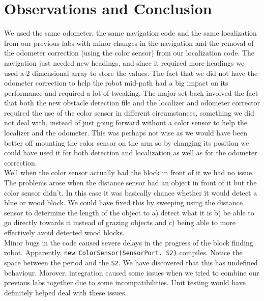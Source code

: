 \documentclass[letterpaper,12pt]{article}
\begin{document}
\section{Observations and Conclusion}{
We used the same odometer, the same navigation code and the same localization from our previous labs with minor changes in the navigation and the removal of the odometer correction (using the color sensor) from our localization code. The navigation just needed new headings, and since it required more headings we used a 2 dimensional array to store the values. The fact that we did not have the odometer correction to help the robot mid-path had a big impact on its performance and required a lot of tweaking. The major set-back involved the fact that both the new obstacle detection file and the localizer and odometer corrector required the use of the color sensor in different circumstances, something we did not deal with, instead of just going forward without a color sensor to help the localizer and the odometer. This was perhaps not wise as we would have been better off mounting the color sensor on the arm so by changing its position we could have used it for both detection and localization as well as for the odometer correction.\\
Well when the color sensor actually had the block in front of it we had no issue. The problems arose when the distance sensor had an object in front of it but the color sensor didn’t. In this case it was basically chance whether it would detect a blue or wood block. We could have fixed this by sweeping  using the distance sensor to determine the length of the object to a) detect what it is b) be able to go directly towards it instead of grazing objects and c) being able to more effectively avoid detected wood blocks.\\
Minor bugs in the code caused severe delays in the progress of the block finding robot. Apparently, \texttt{new ColorSensor(SensorPort. S2)} compiles. Notice the space between the period and the \texttt{S2}. We have discovered that this has undefined behaviour. Morover, integration caused some issues when we tried to combine our previous labs together due to some incompatibilities. Unit testing would have definitely helped deal with these issues.
}
\end{document}
